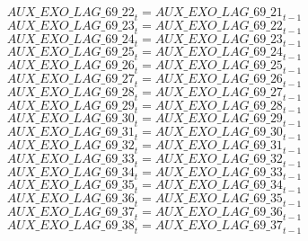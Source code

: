 \begin{dmath}
{AUX\_EXO\_LAG\_69\_22}_{t}={AUX\_EXO\_LAG\_69\_21}_{t-1}
\end{dmath}
\begin{dmath}
{AUX\_EXO\_LAG\_69\_23}_{t}={AUX\_EXO\_LAG\_69\_22}_{t-1}
\end{dmath}
\begin{dmath}
{AUX\_EXO\_LAG\_69\_24}_{t}={AUX\_EXO\_LAG\_69\_23}_{t-1}
\end{dmath}
\begin{dmath}
{AUX\_EXO\_LAG\_69\_25}_{t}={AUX\_EXO\_LAG\_69\_24}_{t-1}
\end{dmath}
\begin{dmath}
{AUX\_EXO\_LAG\_69\_26}_{t}={AUX\_EXO\_LAG\_69\_25}_{t-1}
\end{dmath}
\begin{dmath}
{AUX\_EXO\_LAG\_69\_27}_{t}={AUX\_EXO\_LAG\_69\_26}_{t-1}
\end{dmath}
\begin{dmath}
{AUX\_EXO\_LAG\_69\_28}_{t}={AUX\_EXO\_LAG\_69\_27}_{t-1}
\end{dmath}
\begin{dmath}
{AUX\_EXO\_LAG\_69\_29}_{t}={AUX\_EXO\_LAG\_69\_28}_{t-1}
\end{dmath}
\begin{dmath}
{AUX\_EXO\_LAG\_69\_30}_{t}={AUX\_EXO\_LAG\_69\_29}_{t-1}
\end{dmath}
\begin{dmath}
{AUX\_EXO\_LAG\_69\_31}_{t}={AUX\_EXO\_LAG\_69\_30}_{t-1}
\end{dmath}
\begin{dmath}
{AUX\_EXO\_LAG\_69\_32}_{t}={AUX\_EXO\_LAG\_69\_31}_{t-1}
\end{dmath}
\begin{dmath}
{AUX\_EXO\_LAG\_69\_33}_{t}={AUX\_EXO\_LAG\_69\_32}_{t-1}
\end{dmath}
\begin{dmath}
{AUX\_EXO\_LAG\_69\_34}_{t}={AUX\_EXO\_LAG\_69\_33}_{t-1}
\end{dmath}
\begin{dmath}
{AUX\_EXO\_LAG\_69\_35}_{t}={AUX\_EXO\_LAG\_69\_34}_{t-1}
\end{dmath}
\begin{dmath}
{AUX\_EXO\_LAG\_69\_36}_{t}={AUX\_EXO\_LAG\_69\_35}_{t-1}
\end{dmath}
\begin{dmath}
{AUX\_EXO\_LAG\_69\_37}_{t}={AUX\_EXO\_LAG\_69\_36}_{t-1}
\end{dmath}
\begin{dmath}
{AUX\_EXO\_LAG\_69\_38}_{t}={AUX\_EXO\_LAG\_69\_37}_{t-1}
\end{dmath}
